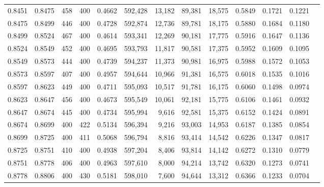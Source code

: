 \begin{tabular}{rrrrrrrrrrrrr}
0.8451 & 0.8475 &    458 &   400 &                                     0.4662 & 592,428 &  13,182 &  89,381 &  18,575 & 0.5849 & 0.1721 & 0.1221 \\
0.8475 & 0.8499 &    446 &   400 &                                     0.4728 & 592,874 &  12,736 &  89,781 &  18,175 & 0.5880 & 0.1684 & 0.1180 \\
0.8499 & 0.8524 &    467 &   400 &                                     0.4614 & 593,341 &  12,269 &  90,181 &  17,775 & 0.5916 & 0.1647 & 0.1136 \\
0.8524 & 0.8549 &    452 &   400 &                                     0.4695 & 593,793 &  11,817 &  90,581 &  17,375 & 0.5952 & 0.1609 & 0.1095 \\
0.8549 & 0.8573 &    444 &   400 &                                     0.4739 & 594,237 &  11,373 &  90,981 &  16,975 & 0.5988 & 0.1572 & 0.1053 \\
0.8573 & 0.8597 &    407 &   400 &                                     0.4957 & 594,644 &  10,966 &  91,381 &  16,575 & 0.6018 & 0.1535 & 0.1016 \\
0.8597 & 0.8623 &    449 &   400 &                                     0.4711 & 595,093 &  10,517 &  91,781 &  16,175 & 0.6060 & 0.1498 & 0.0974 \\
0.8623 & 0.8647 &    456 &   400 &                                     0.4673 & 595,549 &  10,061 &  92,181 &  15,775 & 0.6106 & 0.1461 & 0.0932 \\
0.8647 & 0.8674 &    445 &   400 &                                     0.4734 & 595,994 &   9,616 &  92,581 &  15,375 & 0.6152 & 0.1424 & 0.0891 \\
0.8674 & 0.8699 &    400 &   422 &                                     0.5134 & 596,394 &   9,216 &  93,003 &  14,953 & 0.6187 & 0.1385 & 0.0854 \\
0.8699 & 0.8725 &    400 &   411 &                                     0.5068 & 596,794 &   8,816 &  93,414 &  14,542 & 0.6226 & 0.1347 & 0.0817 \\
0.8725 & 0.8751 &    410 &   400 &                                     0.4938 & 597,204 &   8,406 &  93,814 &  14,142 & 0.6272 & 0.1310 & 0.0779 \\
0.8751 & 0.8778 &    406 &   400 &                                     0.4963 & 597,610 &   8,000 &  94,214 &  13,742 & 0.6320 & 0.1273 & 0.0741 \\
0.8778 & 0.8806 &    400 &   430 &                                     0.5181 & 598,010 &   7,600 &  94,644 &  13,312 & 0.6366 & 0.1233 & 0.0704 \\

\end{tabular}
